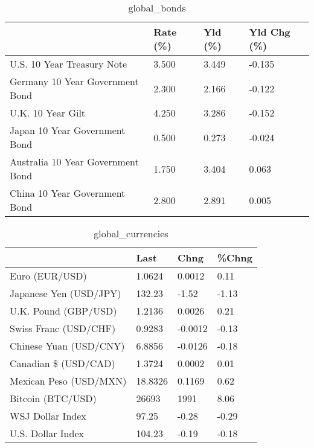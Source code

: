 \documentclass{article}%
\begin{document}
%


\begin{table}[htbp]%
\caption{global\_bonds}%
\centering%
\begin{adjustbox}{width=1\textwidth}%
\begin{tabular}{llll}
\toprule
                                  & Rate (\%) & Yld (\%) & Yld Chg (\%) \\
\midrule
       U.S. 10 Year Treasury Note &    3.500 &   3.449 &      -0.135 \\
  Germany 10 Year Government Bond &    2.300 &   2.166 &      -0.122 \\
                U.K. 10 Year Gilt &    4.250 &   3.286 &      -0.152 \\
    Japan 10 Year Government Bond &    0.500 &   0.273 &      -0.024 \\
Australia 10 Year Government Bond &    1.750 &   3.404 &       0.063 \\
    China 10 Year Government Bond &    2.800 &   2.891 &       0.005 \\
\bottomrule
\end{tabular}
%
\end{adjustbox}%
\end{table}

%


\begin{table}[htbp]%
\caption{global\_currencies}%
\centering%
\begin{adjustbox}{width=1\textwidth}%
\begin{tabular}{llll}
\toprule
                       &    Last &    Chng & \%Chng \\
\midrule
        Euro (EUR/USD) &  1.0624 &  0.0012 &  0.11 \\
Japanese Yen (USD/JPY) &  132.23 &   -1.52 & -1.13 \\
  U.K. Pound (GBP/USD) &  1.2136 &  0.0026 &  0.21 \\
 Swiss Franc (USD/CHF) &  0.9283 & -0.0012 & -0.13 \\
Chinese Yuan (USD/CNY) &  6.8856 & -0.0126 & -0.18 \\
  Canadian \$ (USD/CAD) &  1.3724 &  0.0002 &  0.01 \\
Mexican Peso (USD/MXN) & 18.8326 &  0.1169 &  0.62 \\
     Bitcoin (BTC/USD) &   26693 &    1991 &  8.06 \\
      WSJ Dollar Index &   97.25 &   -0.28 & -0.29 \\
     U.S. Dollar Index &  104.23 &   -0.19 & -0.18 \\
\bottomrule
\end{tabular}
%
\end{adjustbox}%
\end{table}
\end{document}
